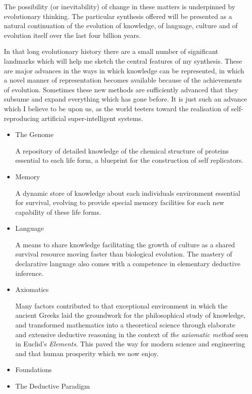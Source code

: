 \documentclass[10pt,titlepage]{book}
\begin{document}
The possibility (or inevitability) of change in these matters is underpinned by evolutionary thinking.
The particular synthesis offered will be presented as a natural continuation of the evolution of knowledge, of language, culture and of evolution itself over the last four billion years.

In that long evolutionary history there are a small number of significant landmarks which will help me sketch the central features of my synthesis.
These are major advances in the ways in which knowledge can be represented, in which a novel manner of representation becomes available  because of the achievements of evolution.
Sometimes these new methods are sufficiently advanced that they subsume and expand everything which has gone before.
It is just such an advance which I believe to be upon us, as the world teeters toward the realisation of self-reproducing artificial super-intelligent systems.

\begin{itemize}
\item{The Genome}
  
  A repository of detailed knowledge of the chemical structure of proteins essential to each life form, a blueprint for the construction of self replicators.
  
\item{Memory}
  
  A dynamic store of knowledge about each individuals environment essential for survival, evolving to provide special memory facilities for each new capability of these life forms.
  
\item{Language}
  
  A means to share knowledge facilitating the growth of culture as a shared survival resource moving faster than biological evolution.
 The mastery of declarative language also comes with a competence in elementary deductive inference.
  
\item{Axiomatics}

  Many factors contributed to that exceptional environment in which the ancient Greeks laid the groundwork for the philosophical study of knowledge, and transformed mathematics into a theoretical science through elaborate and extensive deductive reasoning in the context of \emph{the axiomatic method} seen in Euclid's \emph{Elements}\cite{EuclidEL1}.
  This paved the way for modern science and engineering and that human prosperity which we now enjoy.
  
\item{Foundations}


  
\item{The Deductive Paradigm}
  
\end{itemize}
\end{document}
